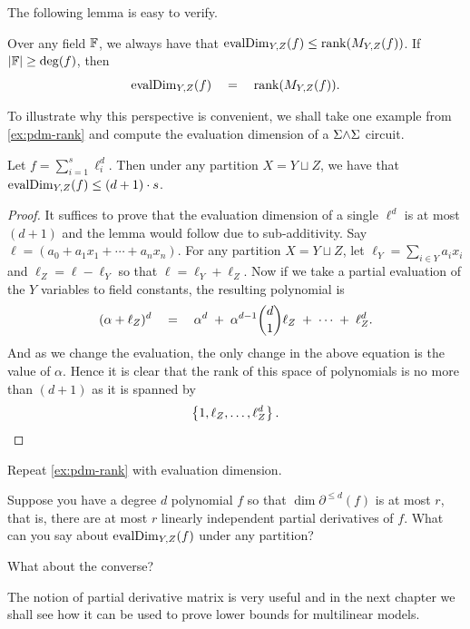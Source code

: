 \noindent 
The following lemma is easy to verify.

\begin{lemma}\label{lem:evalDim-to-coeffDim}
Over any field $\mathbb{F}$, we always have that $\operatorname{evalDim}_{Y,Z}(f) \leq \operatorname{rank}(M_{Y,Z}(f))$. If $|\mathbb{F}| \geq \deg(f)$, then
\[
\operatorname{evalDim}_{Y,Z}(f) \quad = \quad \operatorname{rank}(M_{Y,Z}(f)).
\]
\end{lemma}

To illustrate why this perspective is convenient, we shall take one example from \autoref{ex:pdm-rank} and compute the evaluation dimension of a $\Sigma\mathord{\wedge}\Sigma$ circuit. 

\begin{claim}
Let $f = \sum_{i=1}^s \ell_i^d$. Then under any partition $X = Y \sqcup Z$, we have that $\operatorname{evalDim}_{Y,Z}(f) \leq (d+1) \cdot s$. 
\end{claim}
\begin{proof}
  It suffices to prove that the evaluation dimension of a single $\ell^d$ is at most $(d+1)$ and the lemma would follow due to sub-additivity.
Say $\ell = (a_0 + a_1 x_1 + \cdots + a_nx_n)$.
For any partition $X = Y \sqcup Z$, let $\ell_Y = \sum_{i\in Y} a_i x_i$ and $\ell_Z = \ell - \ell_Y$ so that $\ell = \ell_Y + \ell_Z$. Now if we take a partial evaluation of the $Y$ variables to field constants, the resulting polynomial is 
\[
(\alpha + \ell_Z)^d \quad = \quad \alpha^d \;+\; \alpha^{d-1} \binom{d}{1} \ell_Z \;+\; \cdots \;+\; \ell_Z^d. 
\]
And as we change the evaluation, the only change in the above equation is the value of $\alpha$. Hence it is clear that the rank of this space of polynomials is no more than $(d+1)$ as it is spanned by 
\[
\left\{1, \ell_Z, \ldots, \ell_Z^d\right\}.\qedhere
\]
\end{proof}

\begin{exercise}
Repeat \autoref{ex:pdm-rank} with evaluation dimension. 
\end{exercise}

\begin{exercise}
Suppose you have a degree $d$ polynomial $f$ so that $\dim{\partial^{\leq d}(f)}$ is at most $r$, that is, there are at most $r$ linearly independent partial derivatives of $f$. What can you say about $\operatorname{evalDim}_{Y,Z}(f)$ under any partition? 

What about the converse?
\end{exercise}

\bigskip 

The notion of partial derivative matrix is very useful and in the next chapter we shall see how it can be used to prove lower bounds for multilinear models.

